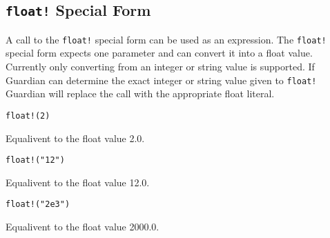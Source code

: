 
\subsection{\texttt{float!} Special Form}
{
	A call to the \texttt{float!} special form can be used as an expression.
	The \texttt{float!} special form expects one parameter and can convert it
	into a float value. Currently only converting from an integer or string
	value is supported.
	If Guardian can determine the exact integer or string value given to
	\texttt{float!} Guardian will replace the call with the appropriate
	float literal.
	
	\begin{itemize}
	{
		\item \texttt{float!(2)}
		
			Equalivent to the float value 2.0.
		
		\item \texttt{float!("12")}
		
			Equalivent to the float value 12.0.
		
		\item \texttt{float!("2e3")}
		
			Equalivent to the float value 2000.0.
	}
	\end{itemize}
}
